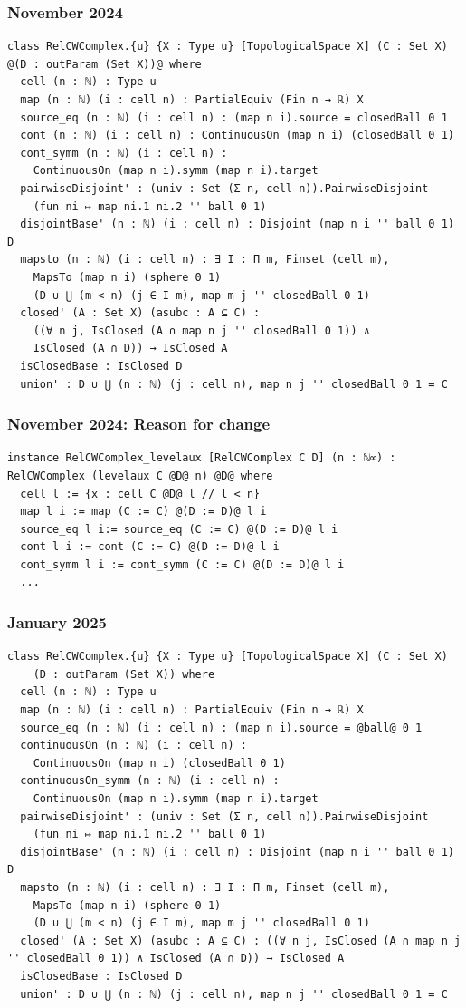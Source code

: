 \documentclass{beamer}
\begin{document}
\begin{frame}[fragile]
\frametitle{November 2024}
\begin{lstlisting}[basicstyle=\ttfamily\scriptsize]
class RelCWComplex.{u} {X : Type u} [TopologicalSpace X] (C : Set X) @(D : outParam (Set X))@ where
  cell (n : ℕ) : Type u
  map (n : ℕ) (i : cell n) : PartialEquiv (Fin n → ℝ) X
  source_eq (n : ℕ) (i : cell n) : (map n i).source = closedBall 0 1
  cont (n : ℕ) (i : cell n) : ContinuousOn (map n i) (closedBall 0 1)
  cont_symm (n : ℕ) (i : cell n) : 
    ContinuousOn (map n i).symm (map n i).target
  pairwiseDisjoint' : (univ : Set (Σ n, cell n)).PairwiseDisjoint 
    (fun ni ↦ map ni.1 ni.2 '' ball 0 1)
  disjointBase' (n : ℕ) (i : cell n) : Disjoint (map n i '' ball 0 1) D
  mapsto (n : ℕ) (i : cell n) : ∃ I : Π m, Finset (cell m),
    MapsTo (map n i) (sphere 0 1) 
    (D ∪ ⋃ (m < n) (j ∈ I m), map m j '' closedBall 0 1)
  closed' (A : Set X) (asubc : A ⊆ C) : 
    ((∀ n j, IsClosed (A ∩ map n j '' closedBall 0 1)) ∧ 
    IsClosed (A ∩ D)) → IsClosed A
  isClosedBase : IsClosed D
  union' : D ∪ ⋃ (n : ℕ) (j : cell n), map n j '' closedBall 0 1 = C
\end{lstlisting}
\end{frame}

\begin{frame}[fragile]
\frametitle{November 2024: Reason for change}
\begin{lstlisting}[basicstyle=\ttfamily\scriptsize]
instance RelCWComplex_levelaux [RelCWComplex C D] (n : ℕ∞) : RelCWComplex (levelaux C @D@ n) @D@ where
  cell l := {x : cell C @D@ l // l < n}
  map l i := map (C := C) @(D := D)@ l i
  source_eq l i:= source_eq (C := C) @(D := D)@ l i
  cont l i := cont (C := C) @(D := D)@ l i
  cont_symm l i := cont_symm (C := C) @(D := D)@ l i
  ...
\end{lstlisting}
\end{frame}

\begin{frame}[fragile]
\frametitle{January 2025}
\begin{lstlisting}[basicstyle=\ttfamily\scriptsize]
class RelCWComplex.{u} {X : Type u} [TopologicalSpace X] (C : Set X) 
    (D : outParam (Set X)) where
  cell (n : ℕ) : Type u
  map (n : ℕ) (i : cell n) : PartialEquiv (Fin n → ℝ) X
  source_eq (n : ℕ) (i : cell n) : (map n i).source = @ball@ 0 1
  continuousOn (n : ℕ) (i : cell n) : 
    ContinuousOn (map n i) (closedBall 0 1)
  continuousOn_symm (n : ℕ) (i : cell n) : 
    ContinuousOn (map n i).symm (map n i).target
  pairwiseDisjoint' : (univ : Set (Σ n, cell n)).PairwiseDisjoint 
    (fun ni ↦ map ni.1 ni.2 '' ball 0 1)
  disjointBase' (n : ℕ) (i : cell n) : Disjoint (map n i '' ball 0 1) D
  mapsto (n : ℕ) (i : cell n) : ∃ I : Π m, Finset (cell m),
    MapsTo (map n i) (sphere 0 1) 
    (D ∪ ⋃ (m < n) (j ∈ I m), map m j '' closedBall 0 1)
  closed' (A : Set X) (asubc : A ⊆ C) : ((∀ n j, IsClosed (A ∩ map n j '' closedBall 0 1)) ∧ IsClosed (A ∩ D)) → IsClosed A
  isClosedBase : IsClosed D
  union' : D ∪ ⋃ (n : ℕ) (j : cell n), map n j '' closedBall 0 1 = C
\end{lstlisting}

\end{frame}
\end{document}
